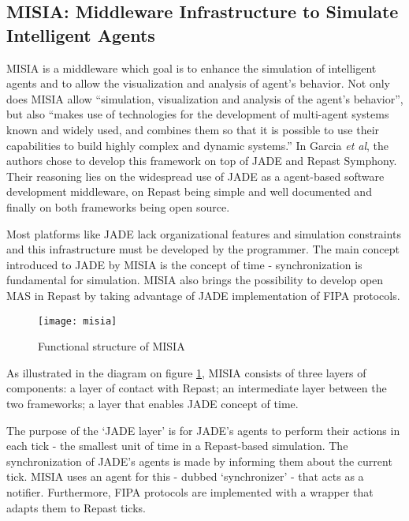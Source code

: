 \subsection{MISIA: Middleware Infrastructure to Simulate Intelligent Agents}

	MISIA is a middleware which goal is to enhance the simulation of intelligent agents and to allow the visualization and analysis of agent's behavior. Not only does MISIA allow ``simulation, visualization and analysis of the agent’s behavior'', but also ``makes use of technologies for the development of multi-agent systems known and widely used, and combines them so that it is possible to use their capabilities to build highly complex and dynamic systems.'' In Garcia \textit{et al}, the authors chose to develop this framework on top of JADE and Repast Symphony. Their reasoning lies on the widespread use of JADE as a agent-based software development middleware, on Repast being simple and well documented and finally on both frameworks being open source. \cite{garcia2011misia}


	Most platforms like JADE lack organizational features and simulation constraints and this infrastructure must be developed by the programmer. The main concept introduced to JADE by MISIA is the concept of time - synchronization is fundamental for simulation. MISIA also brings the possibility to develop open MAS in Repast by taking advantage of JADE implementation of FIPA protocols.

	\begin{figure}[t]
	  \begin{center}
	    \leavevmode
	    \texttt{[image: misia]}
	    \caption{Functional structure of MISIA \cite{garcia2011misia}}
	    \label{fig:misiadiagram}
	  \end{center}
	\end{figure}

	As illustrated in the diagram on figure \ref{fig:misiadiagram}, MISIA consists of three layers of components: a layer of contact with Repast; an intermediate layer between the two frameworks; a layer that enables JADE concept of time.

	The purpose of the `JADE layer' is for JADE's agents to perform their actions in each tick - the smallest unit of time in a Repast-based simulation. The synchronization of JADE's agents is made by informing them about the current tick. MISIA uses an agent for this - dubbed `synchronizer' - that acts as a notifier. Furthermore, FIPA protocols are implemented with a wrapper that adapts them to Repast ticks.

